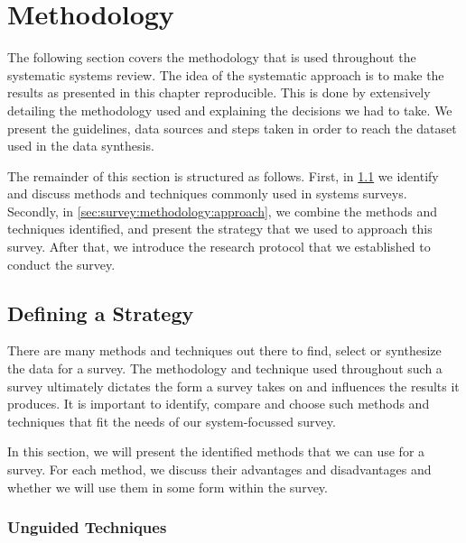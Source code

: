 \section{Methodology}
\label{sec:survey:methodology}

The following section covers the methodology that is used throughout the systematic systems review. The idea of the systematic approach is to make the results as presented in this chapter reproducible. This is done by extensively detailing the methodology used and explaining the decisions we had to take. We present the guidelines, data sources and steps taken in order to reach the dataset used in the data synthesis. 

The remainder of this section is structured as follows. First, in \cref{sec:survey:methodology:strategy} we identify and discuss methods and techniques commonly used in systems surveys. Secondly, in \cref{sec:survey:methodology:approach}, we combine the methods and techniques identified, and present the strategy that we used to approach this survey. After that, we introduce the research protocol that we established to conduct the survey.




\subsection{Defining a Strategy}
\label{sec:survey:methodology:strategy}



There are many methods and techniques out there to find, select or synthesize the data for a survey. The methodology and technique used throughout such a survey ultimately dictates the form a survey takes on and influences the results it produces. It is important to identify, compare and choose such methods and techniques that fit the needs of our system-focussed survey. 

In this section, we will present the identified methods that we can use for a survey. For each method, we discuss their advantages and disadvantages and whether we will use them in some form within the survey.

\subsubsection{Unguided Techniques}
\label{sec:survey:methodology:strategy:unguided}

